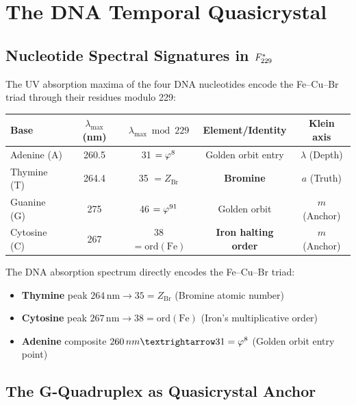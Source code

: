 \section{The DNA Temporal Quasicrystal}
\label{sec:dna-tqc}

\subsection{Nucleotide Spectral Signatures in $F_{229}^*$}

The UV absorption maxima of the four DNA nucleotides encode the Fe--Cu--Br triad through their residues modulo 229:

\begin{center}
\begin{tabular}{lcccc}
\toprule
Base & $\lambda_{\max}$ (nm) & $\lambda_{\max} \bmod 229$ & Element/Identity & Klein axis \\
\midrule
Adenine (A)  & 260.5 & 31 $= \varphi^8$ & Golden orbit entry & $\lambda$ (Depth) \\
Thymine (T)  & 264.4 & 35 $= Z_{\mathrm{Br}}$ & \textbf{Bromine} & $a$ (Truth) \\
Guanine (G)  & 275   & 46 $= \varphi^{91}$ & Golden orbit & $m$ (Anchor) \\
Cytosine (C) & 267   & 38 $= \mathrm{ord}(\mathrm{Fe})$ & \textbf{Iron halting order} & $m$ (Anchor) \\
\bottomrule
\end{tabular}
\end{center}

The DNA absorption spectrum directly encodes the Fe--Cu--Br triad:
\begin{itemize}
  \item \textbf{Thymine} peak $264\,\mathrm{nm} \to 35 = Z_{\mathrm{Br}}$ (Bromine atomic number)
  \item \textbf{Cytosine} peak $267\,\mathrm{nm} \to 38 = \mathrm{ord}(\mathrm{Fe})$ (Iron's multiplicative order)
  \item \textbf{Adenine} composite $260\,\mathrm{nm} \to 31 = \vp^8$ (Golden orbit entry point)
\end{itemize}

\subsection{The G-Quadruplex as Quasicrystal Anchor}

